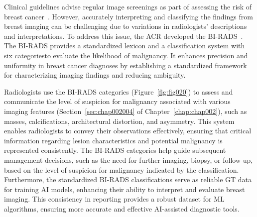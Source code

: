 Clinical guidelines advise regular image screenings as part of assessing the risk of breast cancer~\cite{MIAO201817}.
However, accurately interpreting and classifying the findings from breast imaging can be challenging due to variations in radiologists' descriptions and interpretations.
To address this issue, the \acf{ACR} developed the \acf{BI-RADS}~\cite{d2018breast}.
The \ac{BI-RADS} provides a standardized lexicon and a classification system with six categories\footnotemark[15] to evaluate the likelihood of malignancy.
It enhances precision and uniformity in breast cancer diagnoses by establishing a standardized framework for characterizing imaging findings and reducing ambiguity.


Radiologists use the \ac{BI-RADS} categories (Figure~\ref{fig:fig020}) to assess and communicate the level of suspicion for malignancy associated with various imaging features (Section~\ref{sec:chap002004} of Chapter~\ref{chap:chap002}), such as masses, calcifications, architectural distortion, and asymmetry.
This system enables radiologists to convey their observations effectively, ensuring that critical information regarding lesion characteristics and potential malignancy is represented consistently.
The \ac{BI-RADS} categories help guide subsequent management decisions, such as the need for further imaging, biopsy, or follow-up, based on the level of suspicion for malignancy indicated by the classification.
Furthermore, the standardized \ac{BI-RADS} classifications serve as reliable \ac{GT} data for training \ac{AI} models, enhancing their ability to interpret and evaluate breast imaging.
This consistency in reporting provides a robust dataset for \ac{ML} algorithms, ensuring more accurate and effective \ac{AI}-assisted diagnostic tools.


